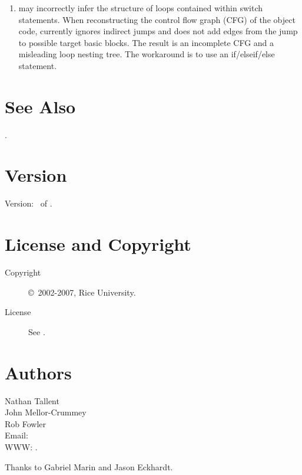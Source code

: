 \documentclass[english]{article}
\begin{document}
\begin{enumerate}

\item {} may incorrectly infer the structure of loops contained within switch statements.
When reconstructing the control flow graph (CFG) of the object code,  currently ignores indirect jumps and does not add edges from the jump to possible target basic blocks.
The result is an incomplete CFG and a misleading loop nesting tree.
The workaround is to use an if/elseif/else statement.

\end{enumerate}

\section{See Also}

.

\section{Version}

Version: \Version\ of \Date.

\section{License and Copyright}

\begin{description}
\item[Copyright] \copyright\ 2002-2007, Rice University.
\item[License] See .
\end{description}

\section{Authors}

\noindent
Nathan Tallent \\
John Mellor-Crummey \\
Rob Fowler \\
Email:  \\
WWW: .

Thanks to Gabriel Marin and Jason Eckhardt.

\LatexManEnd
\end{document}
